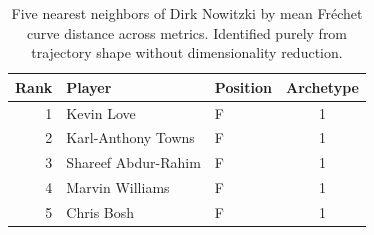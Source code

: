 \begin{table}[htbp]
  \centering\small
  \begin{tabular}{rllc}
    \toprule
    Rank & Player & Position & Archetype \\
    \midrule
    1 & Kevin Love & F & 1 \\
    2 & Karl-Anthony Towns & F & 1 \\
    3 & Shareef Abdur-Rahim & F & 1 \\
    4 & Marvin Williams & F & 1 \\
    5 & Chris Bosh & F & 1 \\
    \bottomrule
  \end{tabular}
  \caption{Five nearest neighbors of Dirk Nowitzki by mean Fr\'{e}chet curve distance across metrics. Identified purely from trajectory shape without dimensionality reduction.}
  \label{tab:Dirk_Nowitzki_frechet_curve_neighbors}
\end{table}

